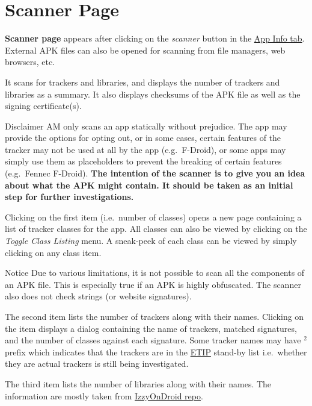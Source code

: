\section{Scanner Page}\label{sec:scanner-page}
\textbf{Scanner page} appears after clicking on the \emph{scanner} button in the \hyperref[subsec:app-info-tab]{App Info
tab}. External APK files can also be opened for scanning from file managers, web browsers, etc.

It scans for trackers and libraries, and displays the number of trackers and libraries as a summary. It also displays
checksums of the APK file as well as the signing certificate(s).

\begin{danger}{Disclaimer}
    AM only scans an app statically without prejudice. The app may provide the options for opting out, or in some cases,
    certain features of the tracker may not be used at all by the app (e.g.\ F-Droid), or some apps may simply use them
    as placeholders to prevent the breaking of certain features (e.g.\ Fennec F-Droid). \textbf{The intention of the
    scanner is to give you an idea about what the APK might contain. It should be taken as an initial step for further
    investigations.}
\end{danger}

Clicking on the first item (i.e.\ number of classes) opens a new page containing a list of tracker classes for the app.
All classes can also be viewed by clicking on the \textit{Toggle Class Listing} menu. A sneak-peek of each class can be
viewed by simply clicking on any class item.

\begin{tip}{Notice}
    Due to various limitations, it is not possible to scan all the components of an APK file. This is especially true if
    an APK is highly obfuscated. The scanner also does not check strings (or website signatures).
\end{tip}

The second item lists the number of trackers along with their names. Clicking on the item displays a dialog containing
the name of trackers, matched signatures, and the number of classes against each signature. Some tracker names may have
$^2$ prefix which indicates that the trackers are in the \href{https://etip.exodus-privacy.eu.org}{ETIP} stand-by list
i.e.\ whether they are actual trackers is still being investigated.

The third item lists the number of libraries along with their names. The information are mostly taken from
\href{https://gitlab.com/IzzyOnDroid/repo}{IzzyOnDroid repo}.

